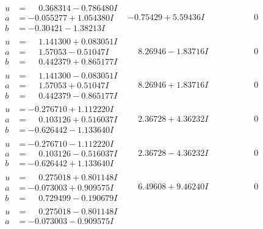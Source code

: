 \documentclass[1p]{elsarticle_modified}
\theoremstyle{definition}
\begin{document}
$$\begin{array}{c|c|c}
 \hline 
\begin{aligned}
u &= \phantom{-}0.368314 - 0.786480 I \\
a &= -0.055277 + 1.054380 I \\
b &= -0.30421 - 1.38213 I\end{aligned}
 & -0.75429 + 5.59436 I & \phantom{-0.000000 } 0 \\ \hline\begin{aligned}
u &= \phantom{-}1.141300 + 0.083051 I \\
a &= \phantom{-}1.57053 - 0.51047 I \\
b &= \phantom{-}0.442379 + 0.865177 I\end{aligned}
 & \phantom{-}8.26946 - 1.83716 I & \phantom{-0.000000 } 0 \\ \hline\begin{aligned}
u &= \phantom{-}1.141300 - 0.083051 I \\
a &= \phantom{-}1.57053 + 0.51047 I \\
b &= \phantom{-}0.442379 - 0.865177 I\end{aligned}
 & \phantom{-}8.26946 + 1.83716 I & \phantom{-0.000000 } 0 \\ \hline\begin{aligned}
u &= -0.276710 + 1.112220 I \\
a &= \phantom{-}0.103126 + 0.516037 I \\
b &= -0.626442 - 1.133640 I\end{aligned}
 & \phantom{-}2.36728 + 4.36232 I & \phantom{-0.000000 } 0 \\ \hline\begin{aligned}
u &= -0.276710 - 1.112220 I \\
a &= \phantom{-}0.103126 - 0.516037 I \\
b &= -0.626442 + 1.133640 I\end{aligned}
 & \phantom{-}2.36728 - 4.36232 I & \phantom{-0.000000 } 0 \\ \hline\begin{aligned}
u &= \phantom{-}0.275018 + 0.801148 I \\
a &= -0.073003 + 0.909575 I \\
b &= \phantom{-}0.729499 - 0.190679 I\end{aligned}
 & \phantom{-}6.49608 + 9.46240 I & \phantom{-0.000000 } 0 \\ \hline\begin{aligned}
u &= \phantom{-}0.275018 - 0.801148 I \\
a &= -0.073003 - 0.909575 I \\

\end{aligned}
\end{array}$$
\end{document}
